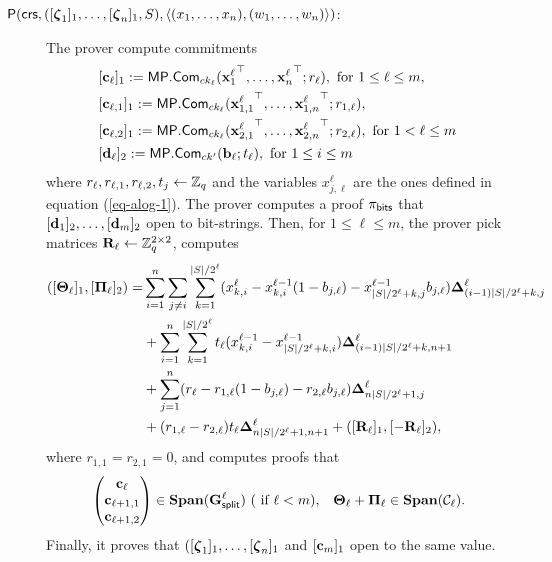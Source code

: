 \begin{description}
\item[{$\mathsf{P}(\mathsf{crs}, ([{\boldsymbol \zeta}_1]_1, \ldots, [{\boldsymbol \zeta}_n]_1,S), \langle (x_1,\ldots,x_n),(w_1,\ldots,w_n) \rangle)$}:]
The prover compute commitments
\begin{align*}
&[\mathbf{c}_\ell]_1:=\mathsf{MP}.\mathsf{Com}_{ck_\ell}({\mathbf{x}^\ell_1}^\top,\ldots,{\mathbf{x}^\ell_n}^\top;r_\ell), \text{ for }1\leq \ell \leq m,\\
&[\mathbf{c}_{\ell,1}]_1:=\mathsf{MP}.\mathsf{Com}_{ck_\ell}({\mathbf{x}^\ell_{1,1}}^\top,\ldots,{\mathbf{x}^\ell_{1,n}}^\top;r_{1,\ell}),\\
&[\mathbf{c}_{\ell,2}]_1:=\mathsf{MP}.\mathsf{Com}_{ck_\ell}({\mathbf{x}^\ell_{2,1}}^\top,\ldots,{\mathbf{x}^\ell_{2,n}}^\top;r_{2,\ell}), \text{ for } 1<\ell\leq m\\
&[\mathbf{d}_\ell]_2:=\mathsf{MP}.\mathsf{Com}_{ck'}(\mathbf{b}_\ell;t_\ell),\text{ for } 1\leq i\leq m
\end{align*}
 where $r_\ell,r_{\ell,1},r_{\ell,2},t_j\gets\mathbb{Z}_q$ and the variables $x^\ell_{j,\ell}$ are the ones defined in equation (\ref{eq-alog-1}). The prover computes a proof $\pi_{\mathsf{bits}}$ that $[\mathbf{d}_1]_2,\ldots,[\mathbf{d}_m]_2$ open to bit-strings. Then, for $1\leq\ell\leq m$, the prover pick matrices $\mathbf{{R}}_\ell\gets\mathbb{Z}_q^{2\times 2}$, computes
\begin{align*}
([\mathbf{{\Theta}}_\ell]_1,[\mathbf{{\Pi}}_\ell]_2)  = & \sum_{i=1}^n\sum_{j\neq i}\sum_{k=1}^{|S|/2^\ell}(x^\ell_{k,i}-x^{\ell-1}_{k,i}(1-b_{j,\ell})-x^{\ell-1}_{|S|/2^\ell+k,j}b_{j,\ell})\mathbf{{\Delta}}_{(i-1)|S|/2^\ell+k,j}^\ell\\
&+ \sum_{i=1}^n\sum_{k=1}^{|S|/2^\ell}t_\ell(x^{\ell-1}_{k,i}-x^{\ell-1}_{|S|/2^{\ell}+k,i})\mathbf{{\Delta}}_{(i-1)|S|/2^\ell+k,n+1}^\ell \\
&+ \sum_{j=1}^n (r_\ell-r_{1,\ell}(1-b_{j,\ell})-r_{2,\ell}b_{j,\ell})\mathbf{{\Delta}}_{n|S|/2^\ell+1,j}^\ell \\
&+(r_{1,\ell}-r_{2,\ell})t_\ell\mathbf{{\Delta}}^\ell_{n|S|/2^\ell+1,n+1}+([\mathbf{{R}}_\ell]_1,[-\mathbf{{R}}_\ell]_2),
\end{align*}
where $r_{1,1}=r_{2,1}=0$, and computes proofs that
\begin{align*}
&\begin{pmatrix}
\mathbf{c}_{\ell}\\\mathbf{c}_{\ell+1,1}\\\mathbf{c}_{\ell+1,2}
\end{pmatrix}\in
\mathbf{Span}(\mathbf{{G}}^{\ell}_\mathsf{split})\ (\text{ if }\ell< m), &\mathbf{{\Theta_\ell}}+\mathbf{{\Pi_\ell}}\in\mathbf{Span}(\mathcal{C}_\ell).
\end{align*}
Finally, it proves that $([{\boldsymbol \zeta}_1]_1,\ldots,[{\boldsymbol \zeta}_n]_1$ and $[\mathbf{c}_m]_1$ open to the same value.


\end{description}
